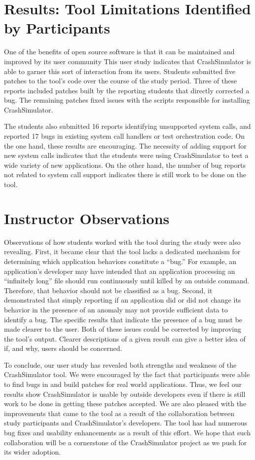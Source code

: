 \section{Results: Tool Limitations Identified by Participants}
\label{subsec:crashsim-patches}

One of the benefits of open source software is that it can be maintained and improved by its user community
This user study indicates that CrashSimulator is able to garner this sort of interaction from its users.
Students submitted five patches
to the tool's code over the
course of the study period.
Three of these reports included patches built by the reporting students that directly
corrected a bug.
The remaining patches fixed issues with the scripts responsible for installing CrashSimulator.

The students also submitted 16 reports identifying unsupported system calls, and reported 17 bugs in
existing system call handlers or test orchestration code.
On the one hand, these results are encouraging.  The necessity of adding
support for new system calls
indicates that the students were
using CrashSimulator to test a wide variety of new applications.
On the other hand, the number of bug reports not related to system call support
indicates there is still work to be done on the tool.


\section{Instructor Observations}
\label{subsec:tool-shortcomings}
Observations of how students worked  with the tool during the study were also revealing.
First,
it became clear that the tool
lacks a dedicated mechanism
for determining
which application behaviors constitute a ``bug.''
For example, an application's developer
may have intended that an application processing an ``infinitely long'' file should run continuously
until killed by an outside command.
Therefore, that behavior should not be classified as a bug.
Second,
it demonstrated that
simply reporting if an application did or did not change its behavior
in the presence of an anomaly may not provide sufficient data to identify a bug. The specific results that indicate the presence of a bug must be made clearer to the user.
Both of these issues could be corrected 
by improving the tool's output.
Clearer descriptions of a given result
can give a better idea of
if,
and why,
users should be concerned.

To conclude, our user study has revealed both strengths and weakness
of the CrashSimulator tool.
We were encouraged by the fact that participants were able to find bugs in and build patches for real world applications.
Thus, we feel our results show CrashSimulator is usable by outside developers even if there is still work to be done in getting these patches accepted. 
We are also pleased with the improvements that came to the tool as a result of the collaboration between study participants and CrashSimulator's developers.
The tool has had numerous bug fixes and usability enhancements as a result of this effort.
We hope that such collaboration will be a cornerstone of the CrashSimulator project as we push for its wider adoption.

